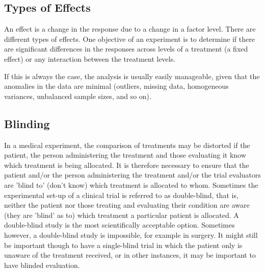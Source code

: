 \documentclass[a4paper,12pt]{article}
\begin{document}
\subsection{Types of Effects}
An effect is a change in the response due to a change in a factor level. There are different types of effects. One objective of an experiment is to determine if there are significant differences in the responses across levels of a treatment (a fixed effect) or any interaction between the treatment levels. 

If this is always the case, the analysis is usually easily manageable, given that the anomalies in the data are minimal (outliers, missing data, homogeneous variances, unbalanced sample sizes, and so on).
\subsection{Blinding}
In a medical experiment, the comparison of treatments may be distorted if the patient, the person administering the treatment and those evaluating it know which treatment is being allocated. It is therefore necessary to ensure that the patient and/or the person administering the treatment and/or the trial evaluators are 'blind to' (don't know) which treatment is allocated to whom.
Sometimes the experimental set-up of a clinical trial is referred to as double-blind, that is, neither the patient nor those treating and evaluating their condition are aware (they are 'blind' as to) which treatment a particular patient is allocated. A double-blind study is the most scientifically acceptable option.
Sometimes however, a double-blind study is impossible, for example in surgery. It might still be important though to have a single-blind trial in which the patient only is unaware of the treatment received, or in other instances, it may be important to have blinded evaluation.
\end{document}
